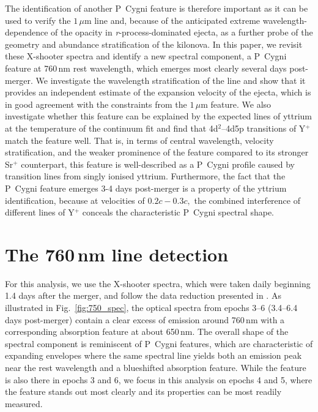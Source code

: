 \documentclass{aa}
\newcommand\titlelowercase[1]{\texorpdfstring{\lowercase{#1}}{#1}}
\newcommand{\rproc}{\textit{r}-process\xspace}
\begin{document}
The identification of another P~Cygni feature is therefore important as it can be used to verify the \(1\,\mu\)m line and, because of the anticipated extreme wavelength-dependence of the opacity in \rproc-dominated ejecta, as a further probe of the geometry and abundance stratification of the kilonova. In this paper, we revisit these X-shooter spectra and identify a new spectral component, a P~Cygni feature at 760\,nm rest wavelength, which emerges most clearly several days post-merger.    %
We investigate the wavelength stratification of the line and show that it provides an independent estimate of the expansion velocity of the ejecta, which is in good agreement with the constraints from the \(1\,\mu\)m feature. We also investigate whether this feature can be explained by the expected lines of yttrium at the temperature of the continuum fit and find that 4d\(^2\)--4d5p transitions of Y\(^+\) match the feature well. That is, in terms of central wavelength, velocity stratification, and the weaker prominence of the feature compared to its stronger Sr\(^+\) counterpart, this feature is well-described as a P~Cygni profile caused by transition lines from singly ionised yttrium. Furthermore, the fact that the P~Cygni feature emerges 3-4 days post-merger is a property of the yttrium identification, because at velocities of $0.2c-0.3c,$ the combined interference of different lines of Y\(^+\) conceals the characteristic P~Cygni spectral shape. 

\section{The 760\,n\titlelowercase{m} line detection }\label{sec:iden}
For this analysis, we use the X-shooter spectra, which were taken daily beginning 1.4 days after the merger, and follow the data reduction presented in \citet{Watson2019}. %
As illustrated in Fig.~\ref{fig:750_spec}, the optical spectra from epochs 3--6 (3.4--6.4 days post-merger) contain a clear excess of emission around 760\,nm with a corresponding absorption feature at about 650\,nm. The overall shape of the spectral component is reminiscent of P~Cygni features, which are characteristic of expanding envelopes where the same spectral line yields both an emission peak near the rest wavelength and a blueshifted absorption feature. While the feature is also there in epochs 3 and 6, we focus in this analysis on epochs 4 and 5, where the feature stands out most clearly and its properties can be most readily measured.%
 
\end{document}

